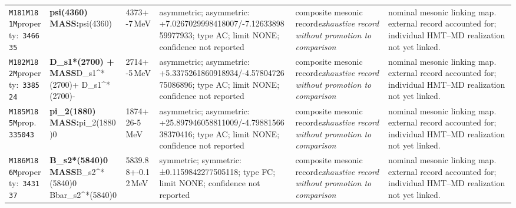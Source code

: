 \begin{landscape}
\begin{longtable}{L{1.85cm}L{4.45cm}L{2.35cm}L{4.05cm}L{3.35cm}L{7.15cm}}
\texttt{M181}\newline \texttt{M181M}\newline property:\ \texttt{346635} & \textbf{psi(4360) MASS:}\newline psi(4360) & 4373+-7\,MeV & asymmetric; asymmetric: +7.0267029998418007/-7.1263389859977933; type AC; limit NONE; confidence not reported & composite mesonic record\newline \emph{exhaustive record without promotion to comparison} & nominal mesonic linking map. external record accounted for; individual HMT--MD realization not yet linked. \\
\texttt{M182}\newline \texttt{M182M}\newline property:\ \texttt{338524} & \textbf{D\_\allowbreak{}s1*(2700) + MASS}\newline D\_\allowbreak{}s1\textasciicircum{}*(2700)+ \textbar{}\allowbreak{} D\_\allowbreak{}s1\textasciicircum{}*(2700)- & 2714+-5\,MeV & asymmetric; asymmetric: +5.3375261860918934/-4.5780472675086896; type AC; limit NONE; confidence not reported & composite mesonic record\newline \emph{exhaustive record without promotion to comparison} & nominal mesonic linking map. external record accounted for; individual HMT--MD realization not yet linked. \\
\texttt{M185}\newline \texttt{M185M}\newline prop.\ \texttt{335043} & \textbf{pi\_\allowbreak{}2(1880) MASS:}\newline pi\_\allowbreak{}2(1880)0 & 1874+26-5\,MeV & asymmetric; asymmetric: +25.897946058811009/-4.7988156638370416; type AC; limit NONE; confidence not reported & composite mesonic record\newline \emph{exhaustive record without promotion to comparison} & nominal mesonic linking map. external record accounted for; individual HMT--MD realization not yet linked. \\
\texttt{M186}\newline \texttt{M186M}\newline property:\ \texttt{343137} & \textbf{B\_\allowbreak{}s2*(5840)0 MASS}\newline B\_\allowbreak{}s2\textasciicircum{}*(5840)0 \textbar{}\allowbreak{} Bbar\_\allowbreak{}s2\textasciicircum{}*(5840)0 & 5839.88+-0.12\,MeV & symmetric; symmetric: ±0.1159842277505118; type FC; limit NONE; confidence not reported & composite mesonic record\newline \emph{exhaustive record without promotion to comparison} & nominal mesonic linking map. external record accounted for; individual HMT--MD realization not yet linked. \\

\end{longtable}
\end{landscape}
